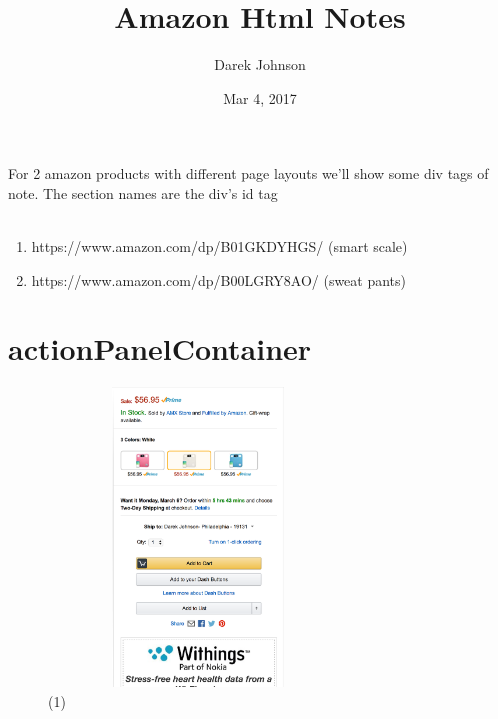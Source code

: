 \documentclass[12pt]{article}
\title{Amazon Html Notes}
\author{Darek Johnson}
\date{Mar 4, 2017}
\begin{document}

\maketitle

\section*{}
For 2 amazon products with different page layouts we'll show some div tags of note. The section names are the div's id tag \\ \\

\begin{enumerate}
	\item https://www.amazon.com/dp/B01GKDYHGS/ (smart scale)
	\item https://www.amazon.com/dp/B00LGRY8AO/  (sweat pants)
\end{enumerate}

\pagebreak 

\section*{actionPanelContainer}
\begin{figure}[htp]
\centering
\includegraphics[width=300px,height=300px]{images/actionPanelContainer(1).png}
\caption{(1)}
\end{figure}


\pagebreak
\end{document}
